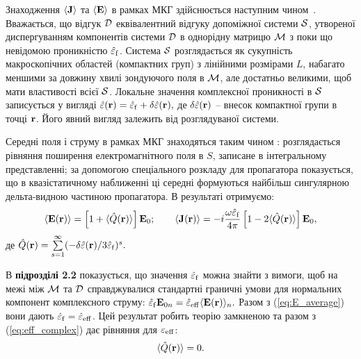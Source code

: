\documentclass[twoside,a4paper,14pt]{vakaref-utf8}
\begin{document}
Знаходження $\langle {\bf{J}}\rangle$ та $\langle {\bf{E}} \rangle$ в рамках МКГ здійснюється наступним чином~\cite{Sushko2017}. Вважається, що відгук $\cal{D}$ еквівалентний відгуку допоміжної системи $\cal{S}$, утвореної диспергуванням компонентів системи $\cal{D}$ в однорідну матрицю $\cal{M}$ з поки що невідомою проникністю $\hat{\varepsilon}_{\rm f}$. Система $\cal{S}$ розглядається як сукупність макроскопічних областей (компактних груп) з лінійними розмірами $L$, набагато меншими за довжину хвилі зондуючого поля в $\cal{M}$, але достатньо великими, щоб мати властивості всієї $\cal{S}$. Локальне значення комплексної проникності в $\cal S$ записується у вигляді
$\label{eq:local_perm}
\hat{\varepsilon} ({\bf r}) = \hat{\varepsilon}_{\rm f} + \delta\hat{\varepsilon} ({\bf r}),
$
де $\delta\hat{\varepsilon} ({\bf r})$ -- внесок компактної групи в точці ${\bf r}$. Його явний вигляд залежить від розглядуваної системи. 

Середні поля і струму в рамках МКГ знаходяться таким чином \cite{Sushko2007, Sushko2009, SushkoJPD2009, Sushko2017}: розглядається рівняння поширення електромагнітного поля в $S$, записане в інтегральному представленні; за допомогою спеціального розкладу \cite{Weighofer1989} для пропагатора показується, що в квазістатичному наближенні ці середні формуються найбільш сингулярною дельта-видною частиною пропагатора. В результаті отримуємо:
\begin{equation}\label{eq:E_average}
\langle {\bf E} ({\bf r}) \rangle =  \left[ 1 + \langle \hat{Q}({\bf r}) \rangle \right] {\bf E}_0;\qquad
\langle {\bf J} ({\bf r}) \rangle = - i  \frac{\omega\hat{\varepsilon}_{\rm f}}{4\pi} \left[ 1 - 2\langle \hat{Q}({\bf r}) \rangle \right] {\bf E}_0,
\end{equation}
де 
$\label{eq:Q}
\hat{Q}({\bf r}) = \sum\limits_{s=1}^{\infty}  (-\delta\hat{\varepsilon}({\bf r})/3\hat{\varepsilon}_{\rm f})^s.
$

В {\bf підрозділі 2.2} показується, що значення $\hat{\varepsilon}_{\rm f}$ можна знайти з вимоги, щоб на межі між $\cal{M}$ та $\cal{D}$ справджувалися стандартні граничні умови для нормальних компонент комплексного струму:
$\label{eq:boundary}
\hat{\varepsilon}_{\rm f} {\bf E}_{0n} = \hat{\varepsilon}_{\rm eff} \langle {\bf E}({\bf r}) \rangle_n.
$
Разом з (\ref{eq:E_average}) вони дають $\hat{\varepsilon}_{\rm f} = \hat{\varepsilon}_{\rm eff}$. Цей результат робить теорію замкненою та разом з (\ref{eq:eff_complex})
дає рівняння для $\varepsilon_{\rm eff}$:
\begin{equation}\label{eq:general_Q}
\langle \hat{Q}({\bf r}) \rangle = 0.
\end{equation}
\end{document}
